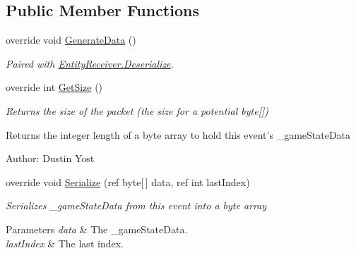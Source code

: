 \subsection*{Public Member Functions}
\begin{DoxyCompactItemize}
\item 
override void \hyperlink{class_skyrates_1_1_common_1_1_entity_1_1_entity_dispatcher_a3e3281a4c3b0890b1519562bee2610d6}{Generate\-Data} ()
\begin{DoxyCompactList}\small\item\em Paired with \hyperlink{class_skyrates_1_1_common_1_1_entity_1_1_entity_receiver_a9da0b7c3a8b9e1ed7d10be74ce80482b}{Entity\-Receiver.\-Deserialize}. \end{DoxyCompactList}\item 
\hypertarget{class_skyrates_1_1_common_1_1_entity_1_1_entity_dispatcher_a16f091819f27f1679cc0b7434793565d}{override int \hyperlink{class_skyrates_1_1_common_1_1_entity_1_1_entity_dispatcher_a16f091819f27f1679cc0b7434793565d}{Get\-Size} ()}\label{class_skyrates_1_1_common_1_1_entity_1_1_entity_dispatcher_a16f091819f27f1679cc0b7434793565d}

\begin{DoxyCompactList}\small\item\em Returns the size of the packet (the size for a potential byte\mbox{[}\mbox{]}) 

\begin{DoxyReturn}{Returns}
the integer length of a byte array to hold this event's \-\_\-game\-State\-Data 
\end{DoxyReturn}


Author\-: Dustin Yost  \end{DoxyCompactList}\item 
\hypertarget{class_skyrates_1_1_common_1_1_entity_1_1_entity_dispatcher_ab2b68b940fbf22e713d149465ac18586}{override void \hyperlink{class_skyrates_1_1_common_1_1_entity_1_1_entity_dispatcher_ab2b68b940fbf22e713d149465ac18586}{Serialize} (ref byte\mbox{[}$\,$\mbox{]} data, ref int last\-Index)}\label{class_skyrates_1_1_common_1_1_entity_1_1_entity_dispatcher_ab2b68b940fbf22e713d149465ac18586}

\begin{DoxyCompactList}\small\item\em Serializes \-\_\-game\-State\-Data from this event into a byte array 


\begin{DoxyParams}{Parameters}
{\em data} & The \-\_\-game\-State\-Data.\\
\hline
{\em last\-Index} & The last index.\\
\hline
\end{DoxyParams}



\end{DoxyCompactList}
\end{DoxyCompactItemize}
